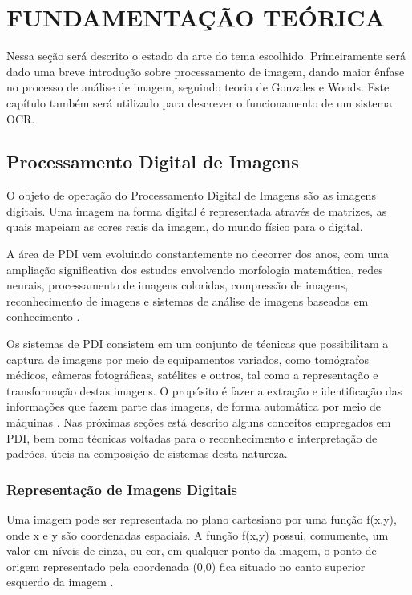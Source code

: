 \chapter{FUNDAMENTAÇÃO TEÓRICA} \label{cap:funda}

Nessa seção será descrito o estado da arte do tema escolhido. Primeiramente será dado uma breve introdução sobre processamento de imagem, dando maior ênfase no processo de análise de imagem, seguindo teoria de Gonzales e Woods. Este capítulo também será utilizado para descrever o funcionamento de um sistema OCR.

\section{Processamento Digital de Imagens}

O objeto de operação do Processamento Digital de Imagens são as imagens digitais\cite{Almeida2018}. Uma imagem na forma digital é representada através de matrizes, as quais mapeiam as cores reais da imagem, do mundo físico para o digital.



A área de PDI vem evoluindo constantemente no decorrer dos anos, com uma ampliação significativa dos estudos envolvendo morfologia matemática, redes neurais, processamento de imagens coloridas, compressão de imagens, reconhecimento de imagens e sistemas de análise de imagens baseados em conhecimento \cite{GONZALEZ2002}. 

Os sistemas de PDI consistem em um conjunto de técnicas que possibilitam a captura de imagens por meio de equipamentos variados, como tomógrafos médicos, câmeras fotográficas, satélites e outros, tal como a representação e transformação destas imagens. O propósito é fazer a extração e identificação das informações que fazem parte das imagens, de forma automática por meio de máquinas \cite{PEDRINI2008}. Nas próximas seções está descrito alguns conceitos empregados em PDI, bem como técnicas voltadas para o reconhecimento e interpretação de padrões, úteis na composição de sistemas desta natureza. 


\subsection{Representação de Imagens Digitais}

Uma imagem pode ser representada no plano cartesiano por uma função f(x,y), onde x e y são coordenadas espaciais. A função f(x,y) possui, comumente, um valor em níveis de cinza, ou cor, em qualquer ponto da imagem, o ponto de origem representado pela coordenada (0,0) fica situado no canto superior esquerdo da imagem \cite{Goncalves2016}.

